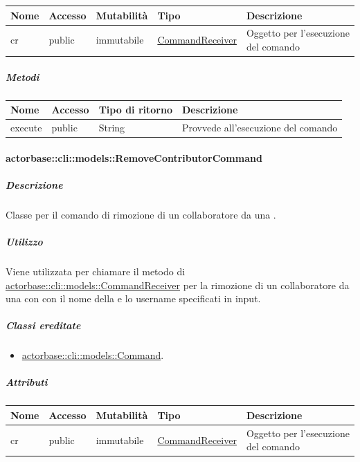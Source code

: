 \documentclass{scalatekids-article}
\begin{document}
\begin{tabular}{| p{1cm} | p{1.5cm} | p{2cm} | p{4cm} | p{8.5cm} |}
  \hline
  Nome & Accesso & Mutabilità & Tipo & Descrizione\\
  \hline
  cr & public & immutabile & \hyperref[sec:actorbase::cli::models::CommandReceiver]{CommandReceiver} & Oggetto per l'esecuzione del comando\\
  \hline
\end{tabular}

\subparagraph{Metodi}

\begin{tabular}{| l | l | l | l |}
  \hline
  Nome & Accesso & Tipo di ritorno & Descrizione\\
  \hline
  execute & public & String & Provvede all'esecuzione del comando\\
  \hline
\end{tabular}

\paragraph{actorbase::cli::models::RemoveContributorCommand}
\label{sec:actorbase::cli::models::RemoveContributorCommand}

\subparagraph{Descrizione}

Classe per il comando di rimozione di un collaboratore da una .

\subparagraph{Utilizzo}

Viene utilizzata per chiamare il metodo di
\hyperref[sec:actorbase::cli::models::CommandReceiver]{actorbase::cli::models::CommandReceiver} per la rimozione di un collaboratore
da una  con con il nome della  e lo username
specificati in input.

\subparagraph{Classi ereditate}

\begin{itemize}
\item \hyperref[sec:actorbase::cli::models::Command]{actorbase::cli::models::Command}.
\end{itemize}

\subparagraph{Attributi}

\begin{tabular}{| p{1cm} | p{1.5cm} | p{2cm} | p{4cm} | p{8.5cm} |}
  \hline
  Nome & Accesso & Mutabilità & Tipo & Descrizione\\
  \hline
  cr & public & immutabile & \hyperref[sec:actorbase::cli::models::CommandReceiver]{CommandReceiver} & Oggetto per l'esecuzione del comando\\
  \hline
\end{tabular}
\end{document}
